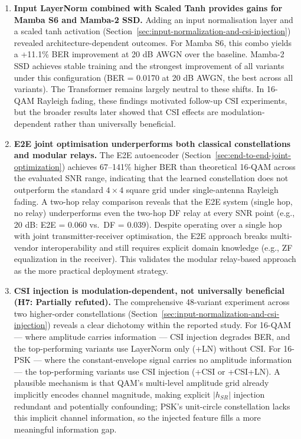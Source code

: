 \begin{enumerate}
\item
  \textbf{Input LayerNorm combined with Scaled Tanh provides gains for Mamba S6 and Mamba-2 SSD.} Adding an input normalisation layer and a scaled tanh activation (Section~\ref{sec:input-normalization-and-csi-injection}) revealed architecture-dependent outcomes. For Mamba S6, this combo yields a +11.1\% BER improvement at 20 dB AWGN over the baseline. Mamba-2 SSD achieves stable training and the strongest improvement of all variants under this configuration (BER = 0.0170 at 20 dB AWGN, the best across all variants). The Transformer remains largely neutral to these shifts. In 16-QAM Rayleigh fading, these findings motivated follow-up CSI experiments, but the broader results later showed that CSI effects are modulation-dependent rather than universally beneficial.
\item
  \textbf{E2E joint optimisation underperforms both classical constellations and modular relays.} The E2E autoencoder (Section~\ref{sec:end-to-end-joint-optimization}) achieves 67--141\% higher BER than theoretical 16-QAM across the evaluated SNR range, indicating that the learned constellation does not outperform the standard \(4 \times 4\) square grid under single-antenna Rayleigh fading. A two-hop relay comparison reveals that the E2E system (single hop, no relay) underperforms even the two-hop DF relay at every SNR point (e.g., 20 dB: E2E = 0.060 vs.~DF = 0.039). Despite operating over a single hop with joint transmitter-receiver optimisation, the E2E approach breaks multi-vendor interoperability and still requires explicit domain knowledge (e.g., ZF equalization in the receiver). This validates the modular relay-based approach as the more practical deployment strategy.
\item
  \textbf{CSI injection is modulation-dependent, not universally beneficial (H7: Partially refuted).} The comprehensive 48-variant experiment across two higher-order constellations (Section~\ref{sec:input-normalization-and-csi-injection}) reveals a clear dichotomy within the reported study. For 16-QAM --- where amplitude carries information --- CSI injection degrades BER, and the top-performing variants use LayerNorm only (+LN) without CSI. For 16-PSK --- where the constant-envelope signal carries no amplitude information --- the top-performing variants use CSI injection (+CSI or +CSI+LN). A plausible mechanism is that QAM's multi-level amplitude grid already implicitly encodes channel magnitude, making explicit \(|h_{SR}|\) injection redundant and potentially confounding; PSK's unit-circle constellation lacks this implicit channel information, so the injected feature fills a more meaningful information gap.

\end{enumerate}
